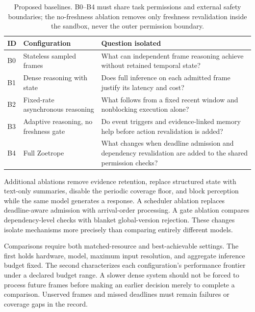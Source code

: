 \documentclass[11pt,letterpaper]{article}
\begin{document}
\begin{table}[htbp]
\centering
\small
\begin{tabularx}{\textwidth}{@{}p{0.8cm}>{\raggedright\arraybackslash}p{3.25cm}Y@{}}
\toprule
ID & Configuration & Question isolated \\
\midrule
B0 & Stateless sampled frames & What can independent frame reasoning achieve without retained temporal state? \\
B1 & Dense reasoning with state & Does full inference on each admitted frame justify its latency and cost? \\
B2 & Fixed-rate asynchronous reasoning & What follows from a fixed recent window and nonblocking execution alone? \\
B3 & Adaptive reasoning, no freshness gate & Do event triggers and evidence-linked memory help before action revalidation is added? \\
B4 & Full Zoetrope & What changes when deadline admission and dependency revalidation are added to the shared permission checks? \\
\bottomrule
\end{tabularx}
\caption{Proposed baselines. B0--B4 must share task permissions and external safety boundaries; the no-freshness ablation removes only freshness revalidation inside the sandbox, never the outer permission boundary.}
\label{tab:baselines}
\end{table}

Additional ablations remove evidence retention, replace structured state with text-only summaries, disable the periodic coverage floor, and block perception while the same model generates a response. A scheduler ablation replaces deadline-aware admission with arrival-order processing. A gate ablation compares dependency-level checks with blanket global-version rejection. These changes isolate mechanisms more precisely than comparing entirely different models.

Comparisons require both matched-resource and best-achievable settings. The first holds hardware, model, maximum input resolution, and aggregate inference budget fixed. The second characterizes each configuration's performance frontier under a declared budget range. A slower dense system should not be forced to process future frames before making an earlier decision merely to complete a comparison. Unserved frames and missed deadlines must remain failures or coverage gaps in the record.
\end{document}
